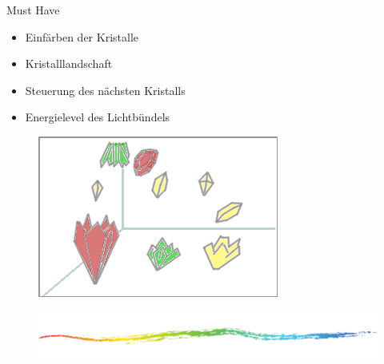 \begin{frame}{Must Have}
	\onetoone
	{
	\begin{itemize}
		\item Einfärben der Kristalle
		\item Kristalllandschaft
		\item Steuerung des nächsten Kristalls
		\item Energielevel des Lichtbündels
	\end{itemize}
	}
	{
		\begin{figure}
			\centering
			\includegraphics[width=\textwidth, height=0.4\textheight, keepaspectratio]{images/Skizzen/start-situation}
		\end{figure}
	}
	\begin{figure}
		\centering
		\includegraphics[width=\textwidth, height=0.7\textheight, keepaspectratio]{images/chalk-154720}
	\end{figure}
\end{frame} 

